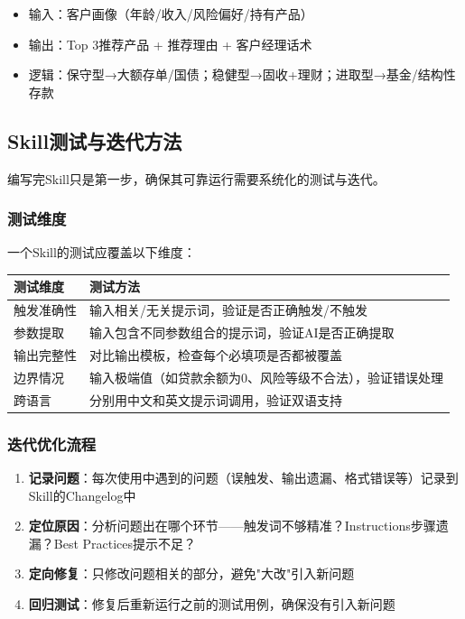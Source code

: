 \begin{itemize}[leftmargin=2em]
  \item 输入：客户画像（年龄/收入/风险偏好/持有产品）
  \item 输出：Top 3推荐产品 + 推荐理由 + 客户经理话术
  \item 逻辑：保守型→大额存单/国债；稳健型→固收+理财；进取型→基金/结构性存款
\end{itemize}

\subsection{Skill测试与迭代方法}

编写完Skill只是第一步，确保其可靠运行需要系统化的测试与迭代。

\subsubsection{测试维度}

一个Skill的测试应覆盖以下维度：

\begin{table}[H]
\centering
\begin{tabular}{lp{8cm}}
\toprule
\textbf{测试维度} & \textbf{测试方法} \\
\midrule
触发准确性 & 输入相关/无关提示词，验证是否正确触发/不触发 \\
参数提取 & 输入包含不同参数组合的提示词，验证AI是否正确提取 \\
输出完整性 & 对比输出模板，检查每个必填项是否都被覆盖 \\
边界情况 & 输入极端值（如贷款余额为0、风险等级不合法），验证错误处理 \\
跨语言 & 分别用中文和英文提示词调用，验证双语支持 \\
\bottomrule
\end{tabular}
\end{table}

\subsubsection{迭代优化流程}

\begin{practicebox}[Skill迭代优化四步法]
\begin{enumerate}[leftmargin=1em]
  \item \textbf{记录问题}：每次使用中遇到的问题（误触发、输出遗漏、格式错误等）记录到Skill的Changelog中
  \item \textbf{定位原因}：分析问题出在哪个环节——触发词不够精准？Instructions步骤遗漏？Best Practices提示不足？
  \item \textbf{定向修复}：只修改问题相关的部分，避免"大改"引入新问题
  \item \textbf{回归测试}：修复后重新运行之前的测试用例，确保没有引入新问题
\end{enumerate}
\end{practicebox}

